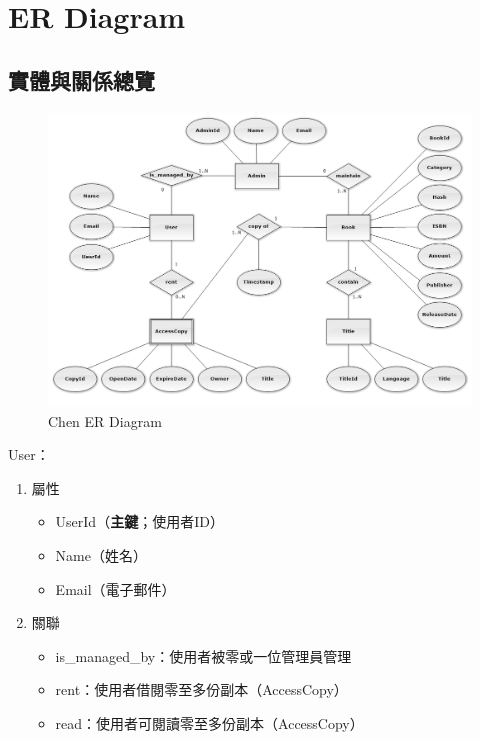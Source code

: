 \chapter{ER Diagram}

\section{實體與關係總覽}

\begin{figure}[ht]
    \centering
    \includegraphics[width=\linewidth]{image/ChenERDiagram.png}
    \captionsetup{justification=centering}
    \caption{Chen ER Diagram}
\end{figure}

\hspace*{-2em}User：

\begin{enumerate}
\item 屬性
    \begin{itemize}
    \item UserId（\textbf{主鍵}；使用者ID）
    \item Name（姓名）
    \item Email（電子郵件）
    \end{itemize}
\item 關聯
    \begin{itemize}
    \item is\_managed\_by：使用者被零或一位管理員管理
    \item rent：使用者借閱零至多份副本（AccessCopy）
    \item read：使用者可閱讀零至多份副本（AccessCopy）
    \end{itemize}
\end{enumerate}

